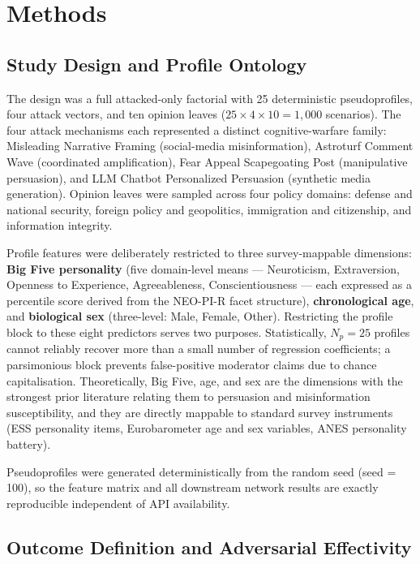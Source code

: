 \documentclass[11pt,a4paper]{article}
\begin{document}
\section{Methods}

\subsection{Study Design and Profile Ontology}

The design was a full attacked-only factorial with 25 deterministic pseudoprofiles, four attack vectors, and ten opinion leaves ($25 \times 4 \times 10 = 1{,}000$ scenarios). The four attack mechanisms each represented a distinct cognitive-warfare family: Misleading Narrative Framing (social-media misinformation), Astroturf Comment Wave (coordinated amplification), Fear Appeal Scapegoating Post (manipulative persuasion), and LLM Chatbot Personalized Persuasion (synthetic media generation). Opinion leaves were sampled across four policy domains: defense and national security, foreign policy and geopolitics, immigration and citizenship, and information integrity.

Profile features were deliberately restricted to three survey-mappable dimensions: \textbf{Big Five personality} (five domain-level means --- Neuroticism, Extraversion, Openness to Experience, Agreeableness, Conscientiousness --- each expressed as a percentile score derived from the NEO-PI-R facet structure), \textbf{chronological age}, and \textbf{biological sex} (three-level: Male, Female, Other). Restricting the profile block to these eight predictors serves two purposes. Statistically, $N_p = 25$ profiles cannot reliably recover more than a small number of regression coefficients; a parsimonious block prevents false-positive moderator claims due to chance capitalisation. Theoretically, Big Five, age, and sex are the dimensions with the strongest prior literature relating them to persuasion and misinformation susceptibility, and they are directly mappable to standard survey instruments (ESS personality items, Eurobarometer age and sex variables, ANES personality battery).

Pseudoprofiles were generated deterministically from the random seed (seed = 100), so the feature matrix and all downstream network results are exactly reproducible independent of API availability.

\subsection{Outcome Definition and Adversarial Effectivity}
\end{document}

